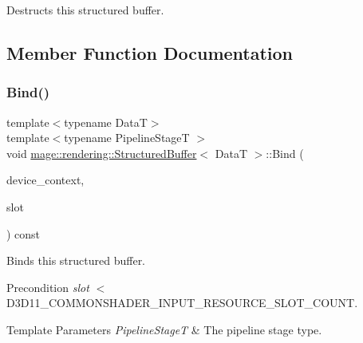 Destructs this structured buffer. 

\subsection{Member Function Documentation}
\mbox{\label{classmage_1_1rendering_1_1_structured_buffer_a46851d2fd8cb5efeda451bb90eaafb7a}} 
\subsubsection{\texorpdfstring{Bind()}{Bind()}}
{\footnotesize\ttfamily template$<$typename DataT$>$ \\
template$<$typename Pipeline\+StageT $>$ \\
void \mbox{\hyperlink{classmage_1_1rendering_1_1_structured_buffer}{mage\+::rendering\+::\+Structured\+Buffer}}$<$ DataT $>$\+::Bind (\begin{DoxyParamCaption}\item[{I\+D3\+D11\+Device\+Context \&}]{device\+\_\+context,  }\item[{\mbox{\hyperlink{namespacemage_a41c104c036fba3756a74e19f793eeaa1}{U32}}}]{slot }\end{DoxyParamCaption}) const\hspace{0.3cm}{\ttfamily [noexcept]}}

Binds this structured buffer.

\begin{DoxyPrecond}{Precondition}
{\itshape slot} $<$ {\ttfamily D3\+D11\+\_\+\+C\+O\+M\+M\+O\+N\+S\+H\+A\+D\+E\+R\+\_\+\+I\+N\+P\+U\+T\+\_\+\+R\+E\+S\+O\+U\+R\+C\+E\+\_\+\+S\+L\+O\+T\+\_\+\+C\+O\+U\+NT}. 
\end{DoxyPrecond}

\begin{DoxyTemplParams}{Template Parameters}
{\em Pipeline\+StageT} & The pipeline stage type. \\
\hline
\end{DoxyTemplParams}

